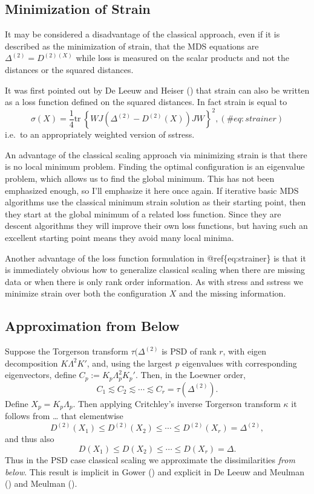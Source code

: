 \documentclass[
  12pt,
  letterpaper,
  DIV=11,
  numbers=noendperiod]{scrreprt}
\theoremstyle{remark}
\begin{document}
\subsection{Minimization of Strain}\label{minimization-of-strain}

It may be considered a disadvantage of the classical approach, even if
it is described as the minimization of strain, that the MDS equations
are \(\Delta^{(2)}= D^{(2)(X)}\) while loss is measured on the scalar
products and not the distances or the squared distances.

It was first pointed out by De Leeuw and Heiser
() that strain can also be
written as a loss function defined on the squared distances. In fact
strain is equal to \begin{equation}
\sigma(X)=\frac14\text{tr}\ \left\{WJ(\Delta^{(2)}-D^{(2)}(X))JW\right\}^2,
(\#eq:strainer)
\end{equation} i.e.~to an appropriately weighted version of sstress.

An advantage of the classical scaling approach via minimizing strain is
that there is no local minimum problem. Finding the optimal
configuration is an eigenvalue problem, which allows us to find the
global minimum. This has not been emphasized enough, so I'll emphasize
it here once again. If iterative basic MDS algorithms use the classical
minimum strain solution as their starting point, then they start at the
global minimum of a related loss function. Since they are descent
algorithms they will improve their own loss functions, but having such
an excellent starting point means they avoid many local minima.

Another advantage of the loss function formulation in
@ref\{eq:strainer\} is that it is immediately obvious how to generalize
classical scaling when there are missing data or when there is only rank
order information. As with stress and sstress we minimize strain over
both the configuration \(X\) and the missing information.

\subsection{Approximation from Below}\label{approximation-from-below}

Suppose the Torgerson transform \(\tau(\Delta^{(2)}\) is PSD of rank
\(r\), with eigen decomposition \(K\Lambda^2 K'\), and, using the
largest \(p\) eigenvalues with corresponding eigenvectors, define
\(C_p:=K_p\Lambda_p^2 K_p'\). Then, in the Loewner order, \[
C_1\lesssim C_2\lesssim\cdots\lesssim C_r=\tau(\Delta^{(2)}).
\] Define \(X_p=K_p\Lambda_p\). Then applying Critchley's inverse
Torgerson transform \(\kappa\) it follows from \ldots{} that elementwise
\[
D^{(2)}(X_1)\leq D^{(2)}(X_2)\leq\cdots\leq D^{(2)}(X_r)=\Delta^{(2)},
\] and thus also \[
D(X_1)\leq D(X_2)\leq\cdots\leq D(X_r)=\Delta.
\] Thus in the PSD case classical scaling we approximate the
dissimilarities \emph{from below}. This result is implicit in Gower
() and explicit in De Leeuw and Meulman
() and Meulman
().
\end{document}
